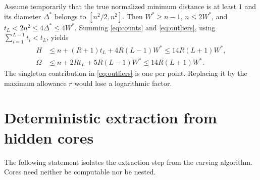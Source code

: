 \documentclass[acmsmall,11pt,nonacm]{acmart}
\theoremstyle{definition}
\begin{document}
Assume temporarily that the true normalized minimum distance is at least
$1$ and its diameter $\Delta^*$ belongs to $[n^2/2,n^2]$. Then
$W^*\geq n-1$, $n\leq2W^*$, and
$t_L<2n^2\leq4\Delta^*\leq4W^*$. Summing
\eqref{eq:counts} and \eqref{eq:outliers}, using
$\sum_{i=1}^{L-1}t_i<t_L$, yields
\begin{align}
 H&\leq n+(R+1)t_L+4R(L-1)W^*
       \leq14R(L+1)W^*,\label{eq:H}\\
 \Omega&\leq n+2Rt_L+5R(L-1)W^*
       \leq14R(L+1)W^*.\label{eq:Omega}
\end{align}
The singleton contribution in \eqref{eq:outliers} is one per point.
Replacing it by the maximum allowance $r$ would lose a logarithmic factor.

\section{Deterministic extraction from hidden cores}\label{sec:extract}

The following statement isolates the extraction step from the carving
algorithm. Cores need neither be computable nor be nested.
\end{document}
